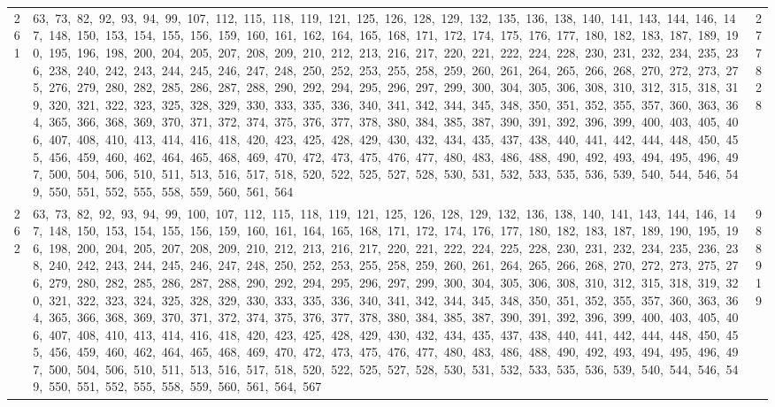 \begin{longtable}{c|p{}|r}
261 & 63,\ 73,\ 82,\ 92,\ 93,\ 94,\ 99,\ 107,\ 112,\ 115,\ 118,\ 119,\ 121,\ 125,\ 126,\ 128,\ 129,\ 132,\ 135,\ 136,\ 138,\ 140,\ 141,\ 143,\ 144,\ 146,\ 147,\ 148,\ 150,\ 153,\ 154,\ 155,\ 156,\ 159,\ 160,\ 161,\ 162,\ 164,\ 165,\ 168,\ 171,\ 172,\ 174,\ 175,\ 176,\ 177,\ 180,\ 182,\ 183,\ 187,\ 189,\ 190,\ 195,\ 196,\ 198,\ 200,\ 204,\ 205,\ 207,\ 208,\ 209,\ 210,\ 212,\ 213,\ 216,\ 217,\ 220,\ 221,\ 222,\ 224,\ 228,\ 230,\ 231,\ 232,\ 234,\ 235,\ 236,\ 238,\ 240,\ 242,\ 243,\ 244,\ 245,\ 246,\ 247,\ 248,\ 250,\ 252,\ 253,\ 255,\ 258,\ 259,\ 260,\ 261,\ 264,\ 265,\ 266,\ 268,\ 270,\ 272,\ 273,\ 275,\ 276,\ 279,\ 280,\ 282,\ 285,\ 286,\ 287,\ 288,\ 290,\ 292,\ 294,\ 295,\ 296,\ 297,\ 299,\ 300,\ 304,\ 305,\ 306,\ 308,\ 310,\ 312,\ 315,\ 318,\ 319,\ 320,\ 321,\ 322,\ 323,\ 325,\ 328,\ 329,\ 330,\ 333,\ 335,\ 336,\ 340,\ 341,\ 342,\ 344,\ 345,\ 348,\ 350,\ 351,\ 352,\ 355,\ 357,\ 360,\ 363,\ 364,\ 365,\ 366,\ 368,\ 369,\ 370,\ 371,\ 372,\ 374,\ 375,\ 376,\ 377,\ 378,\ 380,\ 384,\ 385,\ 387,\ 390,\ 391,\ 392,\ 396,\ 399,\ 400,\ 403,\ 405,\ 406,\ 407,\ 408,\ 410,\ 413,\ 414,\ 416,\ 418,\ 420,\ 423,\ 425,\ 428,\ 429,\ 430,\ 432,\ 434,\ 435,\ 437,\ 438,\ 440,\ 441,\ 442,\ 444,\ 448,\ 450,\ 455,\ 456,\ 459,\ 460,\ 462,\ 464,\ 465,\ 468,\ 469,\ 470,\ 472,\ 473,\ 475,\ 476,\ 477,\ 480,\ 483,\ 486,\ 488,\ 490,\ 492,\ 493,\ 494,\ 495,\ 496,\ 497,\ 500,\ 504,\ 506,\ 510,\ 511,\ 513,\ 516,\ 517,\ 518,\ 520,\ 522,\ 525,\ 527,\ 528,\ 530,\ 531,\ 532,\ 533,\ 535,\ 536,\ 539,\ 540,\ 544,\ 546,\ 549,\ 550,\ 551,\ 552,\ 555,\ 558,\ 559,\ 560,\ 561,\ 564 & 277828 \\
262 & 63,\ 73,\ 82,\ 92,\ 93,\ 94,\ 99,\ 100,\ 107,\ 112,\ 115,\ 118,\ 119,\ 121,\ 125,\ 126,\ 128,\ 129,\ 132,\ 136,\ 138,\ 140,\ 141,\ 143,\ 144,\ 146,\ 147,\ 148,\ 150,\ 153,\ 154,\ 155,\ 156,\ 159,\ 160,\ 161,\ 164,\ 165,\ 168,\ 171,\ 172,\ 174,\ 176,\ 177,\ 180,\ 182,\ 183,\ 187,\ 189,\ 190,\ 195,\ 196,\ 198,\ 200,\ 204,\ 205,\ 207,\ 208,\ 209,\ 210,\ 212,\ 213,\ 216,\ 217,\ 220,\ 221,\ 222,\ 224,\ 225,\ 228,\ 230,\ 231,\ 232,\ 234,\ 235,\ 236,\ 238,\ 240,\ 242,\ 243,\ 244,\ 245,\ 246,\ 247,\ 248,\ 250,\ 252,\ 253,\ 255,\ 258,\ 259,\ 260,\ 261,\ 264,\ 265,\ 266,\ 268,\ 270,\ 272,\ 273,\ 275,\ 276,\ 279,\ 280,\ 282,\ 285,\ 286,\ 287,\ 288,\ 290,\ 292,\ 294,\ 295,\ 296,\ 297,\ 299,\ 300,\ 304,\ 305,\ 306,\ 308,\ 310,\ 312,\ 315,\ 318,\ 319,\ 320,\ 321,\ 322,\ 323,\ 324,\ 325,\ 328,\ 329,\ 330,\ 333,\ 335,\ 336,\ 340,\ 341,\ 342,\ 344,\ 345,\ 348,\ 350,\ 351,\ 352,\ 355,\ 357,\ 360,\ 363,\ 364,\ 365,\ 366,\ 368,\ 369,\ 370,\ 371,\ 372,\ 374,\ 375,\ 376,\ 377,\ 378,\ 380,\ 384,\ 385,\ 387,\ 390,\ 391,\ 392,\ 396,\ 399,\ 400,\ 403,\ 405,\ 406,\ 407,\ 408,\ 410,\ 413,\ 414,\ 416,\ 418,\ 420,\ 423,\ 425,\ 428,\ 429,\ 430,\ 432,\ 434,\ 435,\ 437,\ 438,\ 440,\ 441,\ 442,\ 444,\ 448,\ 450,\ 455,\ 456,\ 459,\ 460,\ 462,\ 464,\ 465,\ 468,\ 469,\ 470,\ 472,\ 473,\ 475,\ 476,\ 477,\ 480,\ 483,\ 486,\ 488,\ 490,\ 492,\ 493,\ 494,\ 495,\ 496,\ 497,\ 500,\ 504,\ 506,\ 510,\ 511,\ 513,\ 516,\ 517,\ 518,\ 520,\ 522,\ 525,\ 527,\ 528,\ 530,\ 531,\ 532,\ 533,\ 535,\ 536,\ 539,\ 540,\ 544,\ 546,\ 549,\ 550,\ 551,\ 552,\ 555,\ 558,\ 559,\ 560,\ 561,\ 564,\ 567 & 988919 \\

\end{longtable}
